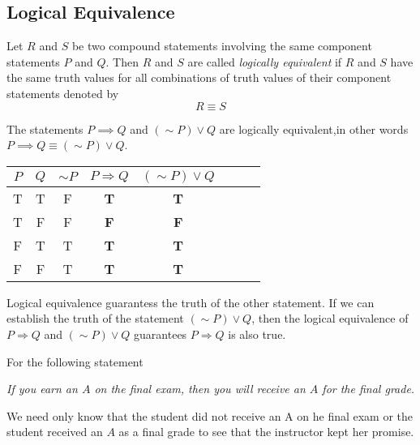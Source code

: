 \subsection{Logical Equivalence}
\begin{defi}
    Let $R$ and $S$ be two compound statements involving the 
    same component statements $P$ and $Q$. Then $R$ and $S$ are 
    called \emph{logically equivalent} if $R$ and $S$ have the same truth
     values for all combinations of truth values of their component statements
     denoted by
     \begin{equation*}
          R \equiv S
     \end{equation*}
\end{defi}
\begin{eg}
    The statements $P \implies Q$ and $(\sim P) \vee Q$ are 
    logically equivalent,in other words 
    $P \implies Q \equiv (\sim P) \vee Q$.
    \begin{center}
        \begin{tabular}{cccccccc}
          \toprule
          $P$ & $Q$ &$\sim P$ & $P \Rightarrow Q$ 
          & $(\sim P) \vee Q$ & \\
          \midrule
          T & T & F & \textbf{T} & \textbf{T}  \\
          T & F & F & \textbf{F} & \textbf{F}  \\
          F & T & T & \textbf{T} & \textbf{T}  \\
          F & F & T & \textbf{T} & \textbf{T}  \\
          \bottomrule
        \end{tabular}
      \end{center}
\end{eg}
Logical equivalence guarantess the truth of the other statement.
If we can establish the truth of the statement $(\sim P) \vee Q$,
 then the logical equivalence of $P \Rightarrow Q$ and $(\sim P) \vee Q$ 
 guarantees $P \Rightarrow Q$ is also true.
\begin{eg}
     For the following statement
     \begin{center}
          \textit{If you earn an $A$ on the final exam, 
          then you will receive an $A$ for the final grade.}
     \end{center}
     We need only know that the student did not receive an A on 
     he final exam or the student received an $A$ as a final grade 
     to see that the instructor kept her promise. 
\end{eg}
